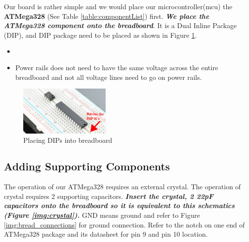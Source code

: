 \documentclass{article}
\begin{document}
Our board is rather simple and we would place our microcontroller(mcu) the \textbf{ATMega328} (See Table \ref{table:componentList}) first. \textbf{\emph{We place the ATMega328 component onto the breadboard}}. It is a Dual Inline Package (DIP), and DIP package need to be placed as shown in Figure \ref{img:dip_breadboard}. \par

\begin{tcolorbox} [title=Tips \& Tricks]
    \begin{itemize}
        \item %
        \item Power rails does not need to have the same voltage across the entire breadboard and not all voltage lines need to go on power rails. 
    \end{itemize}
\end{tcolorbox}

\begin{figure}[!h]
    \center
    \includegraphics[width=0.4\textwidth,keepaspectratio]{dip_breadboard}
    \caption {Placing DIPs into breadboard}
    \label{img:dip_breadboard}
\end{figure}

\subsection{Adding Supporting Components}
The operation of our ATMega328 requires an external crystal. The operation of crystal requires 2 supporting capacitors. \textbf{\emph{Insert the crystal, 2 22pF capacitors onto the breadboard so it is equivalent to this schematics (Figure \ref{img:crystal}).}} GND means ground and refer to Figure \ref{img:bread_connections} for ground connection. Refer to the notch on one end of ATMega328 package and its datasheet for pin 9 and pin 10 location. \par
\end{document}
